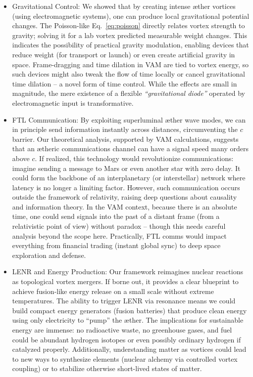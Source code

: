 \begin{itemize}

\item 
Gravitational Control: We showed that by creating intense æther vortices (using electromagnetic systems), one can produce local gravitational potential changes. The Poisson-like Eq. \eqref{eq:poisson} directly relates vortex strength to gravity; solving it for a lab vortex predicted measurable weight changes. This indicates the possibility of practical gravity modulation, enabling devices that reduce weight (for transport or launch) or even create artificial gravity in space. Frame-dragging and time dilation in VAM are tied to vortex energy, so such devices might also tweak the flow of time locally or cancel gravitational time dilation – a novel form of time control. While the effects are small in magnitude, the mere existence of a flexible \textit{“gravitational diode”} operated by electromagnetic input is transformative.




\item 
FTL Communication: By exploiting superluminal æther wave modes, we can in principle send information instantly across distances, circumventing the $c$ barrier. Our theoretical analysis, supported by VAM calculations, suggests that an ætheric communications channel can have a signal speed many orders above $c$. If realized, this technology would revolutionize communications: imagine sending a message to Mars or even another star with zero delay. It could form the backbone of an interplanetary (or interstellar) network where latency is no longer a limiting factor. However, such communication occurs outside the framework of relativity, raising deep questions about causality and information theory. In the VAM context, because there is an absolute time, one could send signals into the past of a distant frame (from a relativistic point of view) without paradox – though this needs careful analysis beyond the scope here. Practically, FTL comms would impact everything from financial trading (instant global sync) to deep space exploration and defense.




\item 
LENR and Energy Production: Our framework reimagines nuclear reactions as topological vortex mergers. If borne out, it provides a clear blueprint to achieve fusion-like energy release on a small scale without extreme temperatures. The ability to trigger LENR via resonance means we could build compact energy generators (fusion batteries) that produce clean energy using only electricity to “pump” the æther. The implications for sustainable energy are immense: no radioactive waste, no greenhouse gases, and fuel could be abundant hydrogen isotopes or even possibly ordinary hydrogen if catalyzed properly. Additionally, understanding matter as vortices could lead to new ways to synthesize elements (nuclear alchemy via controlled vortex coupling) or to stabilize otherwise short-lived states of matter.





\end{itemize}

